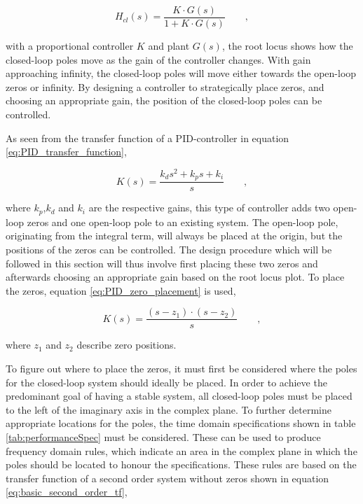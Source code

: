 \documentclass[../../main.tex]{subfiles}
\begin{document}
\begin{equation}\label{eq:closedLoopSystem}
    H_{cl}(s)=\frac{K\cdot G(s)}{1+K\cdot G(s)} \qquad ,
\end{equation}

with a proportional controller $K$ and plant $G(s)$, the root locus shows how the closed-loop poles move as the gain of the controller changes. With gain approaching infinity, the closed-loop poles will move either towards the open-loop zeros or infinity. By designing a controller to strategically place zeros, and choosing an appropriate gain, the position of the closed-loop poles can be controlled.

As seen from the transfer function of a PID-controller in equation \ref{eq:PID_transfer_function},

\begin{equation}\label{eq:PID_transfer_function}
    K(s) = \frac{k_d s^2 + k_p s + k_i}{s} \qquad ,
\end{equation}

where $k_p$,$k_d$ and $k_i$ are the respective gains, this type of controller adds two open-loop zeros and one open-loop pole to an existing system. The open-loop pole, originating from the integral term, will always be placed at the origin, but the positions of the zeros can be controlled. The design procedure which will be followed in this section will thus involve first placing these two zeros and afterwards choosing an appropriate gain based on the root locus plot. To place the zeros, equation \ref{eq:PID_zero_placement} is used, 

\begin{equation}\label{eq:PID_zero_placement}
    K(s) = \frac{(s-z_1)\cdot(s-z_2)}{s} \qquad ,
\end{equation}

where $z_1$ and $z_2$ describe zero positions.

To figure out where to place the zeros, it must first be considered where the poles for the closed-loop system should ideally be placed. In order to achieve the predominant goal of having a stable system, all closed-loop poles must be placed to the left of the imaginary axis in the complex plane. To further determine appropriate locations for the poles, the time domain specifications shown in table \ref{tab:performanceSpec} must be considered. These can be used to produce frequency domain rules, which indicate an area in the complex plane in which the poles should be located to honour the specifications. These rules are based on the transfer function of a second order system without zeros shown in equation \ref{eq:basic_second_order_tf},
\end{document}
